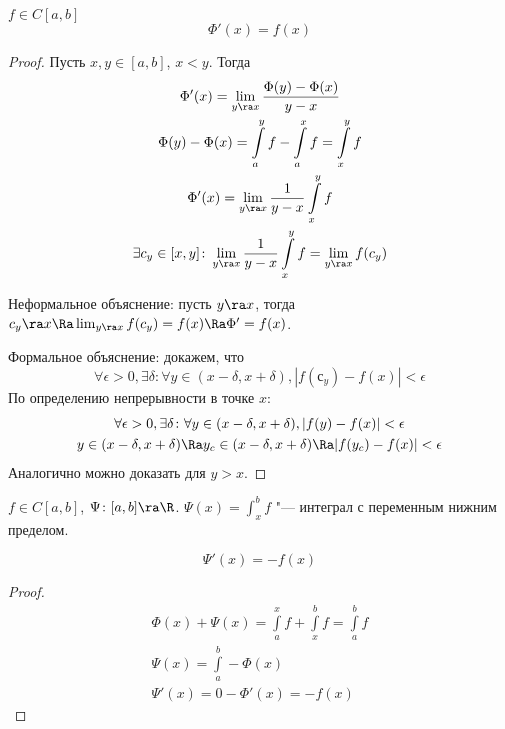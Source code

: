 \begin{theorem}[Барроу]
	$f \in C[a, b]$
	\[\Phi'(x) = f(x)\]
\end{theorem}
\begin{proof}
	Пусть $x, y \in [a, b]$, $x < y$.
	Тогда
	\begin{gather*}
		\Phi'(x) = \lim_{y \ra x} \frac{\Phi (y) - \Phi(x)}{y - x} \\
		\Phi (y) - \Phi (x) = \int\limits_a^y f - \int\limits_a^x f = \int\limits_x^y f \\
		\Phi' (x) = \lim_{y \ra x} \frac{1}{y - x} \int\limits_x^y f \\
		\exists c_y \in [x, y]\colon \lim_{y \ra x} \frac{1}{y - x} \int\limits_x^y f = \lim_{y \ra x} f(c_y)
	\end{gather*}

	Неформальное объяснение: пусть $y \ra x$, тогда $c_y \ra x \Ra \lim_{y \ra x} f(c_y) = f(x) \Ra \Phi' = f(x)$.

	Формальное объяснение: докажем, что
	\[ \forall \epsilon > 0, \exists \delta\colon \forall y \in (x - \delta, x + \delta), |f(с_y) - f(x)| < \epsilon \]
	По определению непрерывности в точке $x$:
	\begin{gather*}
		\forall \epsilon > 0, \exists \delta\colon \forall y \in (x - \delta, x + \delta), |f(y) - f(x)| < \epsilon \\
		y \in (x - \delta, x + \delta) \Ra y_c \in (x - \delta, x + \delta) \Ra |f(y_c) - f(x)| < \epsilon
	 \end{gather*}
	Аналогично можно доказать для $y > x$.
\end{proof}

\begin{Def}
	$f \in C[a, b]$, $\Psi \colon [a, b] \ra \R$.
	$\Psi (x) = \int_x^b f$ "--- интеграл с переменным нижним пределом.
\end{Def}

\begin{conseq}
	\[ \Psi'(x) = -f(x) \]
\end{conseq}
\begin{proof}
	\begin{gather*}
		\Phi (x) + \Psi (x) = \int\limits_a^x f + \int\limits_x^b f = \int\limits_a^b f \\
		\Psi(x) = \int\limits_a^b - \Phi(x)\\
		\Psi'(x) =  0 - \Phi'(x) = -f(x)
	\end{gather*}
\end{proof}

